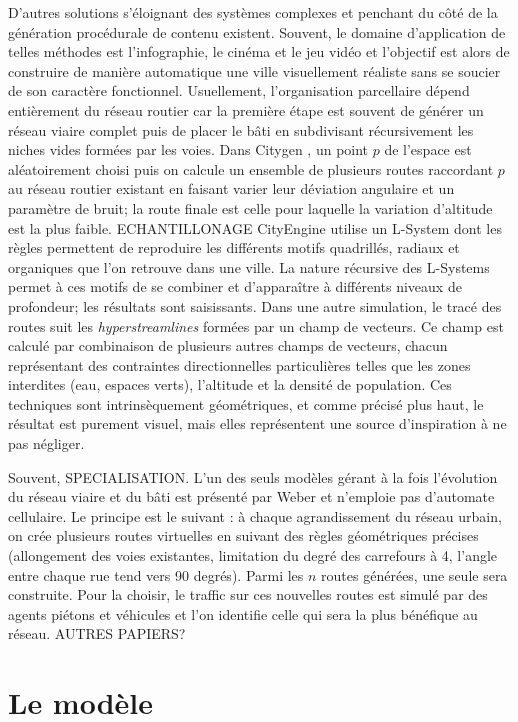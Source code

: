 \documentclass[10pt]{article}
\begin{document}
D'autres solutions s'éloignant des systèmes complexes et penchant du
côté de la génération procédurale de contenu existent. Souvent, le
domaine d'application de telles méthodes est l'infographie, le cinéma
et le jeu vidéo et l'objectif est alors de construire de manière
automatique une ville visuellement réaliste sans se soucier de son
caractère fonctionnel. Usuellement, l'organisation parcellaire dépend
entièrement du réseau routier car la première étape est souvent de
générer un réseau viaire complet puis de placer le bâti en subdivisant
récursivement les niches vides formées par les voies. Dans Citygen
\cite{Kelly2007}, un point $p$ de l'espace est aléatoirement choisi
puis on calcule un ensemble de plusieurs routes raccordant $p$ au
réseau routier existant en faisant varier leur déviation angulaire et
un paramètre de bruit; la route finale est celle pour laquelle la
variation d'altitude est la plus faible. ECHANTILLONAGE CityEngine
\cite{Parish2001} utilise un L-System dont les règles permettent de
reproduire les différents motifs quadrillés, radiaux et organiques que
l'on retrouve dans une ville. La nature récursive des L-Systems permet
à ces motifs de se combiner et d'apparaître à différents niveaux de
profondeur; les résultats sont saisissants. Dans une autre simulation,
le tracé des routes suit les \textit{hyperstreamlines} \cite{Chen2008}
formées par un champ de vecteurs. Ce champ est calculé par combinaison
de plusieurs autres champs de vecteurs, chacun représentant des
contraintes directionnelles particulières telles que les zones
interdites (eau, espaces verts), l'altitude et la densité de
population. Ces techniques sont intrinsèquement géométriques, et comme
précisé plus haut, le résultat est purement visuel, mais elles
représentent une source d'inspiration à ne pas négliger.

Souvent, SPECIALISATION. L'un des seuls modèles gérant à la fois
l'évolution du réseau viaire et du bâti est présenté par Weber
\cite{Weber2009} et n'emploie pas d'automate cellulaire. Le principe
est le suivant : à chaque agrandissement du réseau urbain, on crée
plusieurs routes virtuelles en suivant des règles géométriques
précises (allongement des voies existantes, limitation du degré des
carrefours à 4, l'angle entre chaque rue tend vers 90 degrés). Parmi
les $n$ routes générées, une seule sera construite. Pour la choisir,
le traffic sur ces nouvelles routes est simulé par des agents piétons
et véhicules et l'on identifie celle qui sera la plus bénéfique au
réseau. AUTRES PAPIERS?

\section{Le modèle}
\end{document}

